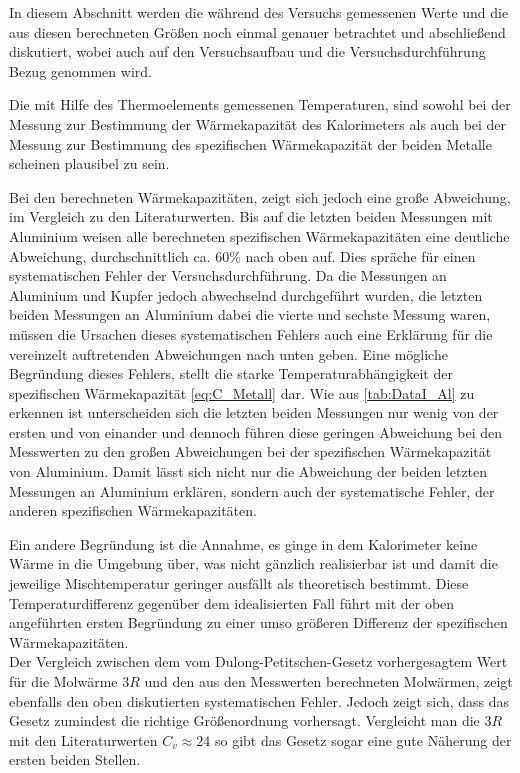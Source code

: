 In diesem Abschnitt werden die während des Versuchs gemessenen Werte und
die aus diesen berechneten Größen noch einmal genauer betrachtet und 
abschließend diskutiert, wobei auch auf den Versuchsaufbau und die
Versuchsdurchführung Bezug genommen wird.


Die mit Hilfe des Thermoelements gemessenen Temperaturen, sind sowohl bei der 
Messung zur Bestimmung der Wärmekapazität des Kalorimeters als auch bei der Messung
zur Bestimmung des spezifischen Wärmekapazität der beiden Metalle scheinen plausibel zu sein.

Bei den berechneten Wärmekapazitäten, zeigt sich jedoch eine große Abweichung, im Vergleich zu den Literaturwerten. Bis auf die letzten beiden Messungen mit Aluminium weisen alle 
berechneten spezifischen Wärmekapazitäten eine deutliche Abweichung, durchschnittlich
ca. 60\% nach oben auf. Dies spräche für einen systematischen Fehler der Versuchsdurchführung.
Da die Messungen an Aluminium und Kupfer jedoch abwechselnd durchgeführt wurden, die letzten beiden Messungen an Aluminium dabei die vierte und sechste Messung waren, müssen die Ursachen dieses systematischen Fehlers auch eine Erklärung für die vereinzelt auftretenden Abweichungen nach unten geben.
Eine mögliche Begründung dieses Fehlers, stellt die starke Temperaturabhängigkeit der 
spezifischen Wärmekapazität \eqref{eq:C_Metall} dar. Wie aus \autoref{tab:DataI_Al} zu erkennen ist unterscheiden sich die letzten beiden Messungen nur wenig von der ersten und von einander und dennoch führen diese geringen Abweichung  bei 
den Messwerten zu den großen Abweichungen bei der spezifischen
Wärmekapazität von Aluminium. Damit lässt sich nicht nur die 
Abweichung der beiden letzten Messungen an Aluminium erklären, sondern
auch der systematische Fehler, der anderen spezifischen
Wärmekapazitäten.

Ein andere Begründung ist die Annahme, es ginge in 
dem Kalorimeter keine Wärme in die Umgebung über, was nicht  
gänzlich realisierbar ist und damit die jeweilige Mischtemperatur 
geringer ausfällt als theoretisch bestimmt.
Diese Temperaturdifferenz gegenüber dem idealisierten Fall führt 
mit der oben angeführten ersten Begründung zu einer umso größeren 
Differenz der spezifischen Wärmekapazitäten.\\

Der Vergleich zwischen dem vom Dulong-Petitschen-Gesetz
vorhergesagtem Wert für die Molwärme $3R$ und den aus den 
Messwerten berechneten Molwärmen, zeigt ebenfalls den oben 
diskutierten systematischen Fehler. 
Jedoch zeigt sich, dass das Gesetz zumindest die richtige 
Größenordnung vorhersagt. Vergleicht man die $3R$ mit den
Literaturwerten $C_{v} \approx 24$ so gibt das Gesetz sogar eine gute 
Näherung der ersten beiden Stellen.            

 
